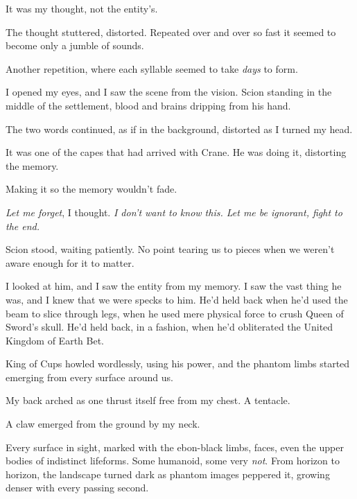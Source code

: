 It was my thought, not the entity's.



The thought stuttered, distorted.  Repeated over and over so fast it seemed to become only a jumble of sounds.



Another repetition, where each syllable seemed to take \emph{days} to form.



I opened my eyes, and I saw the scene from the vision.  Scion standing in the middle of the settlement, blood and brains dripping from his hand.



The two words continued, as if in the background, distorted as I turned my head.



It was one of the capes that had arrived with Crane.  He was doing it, distorting the memory.



Making it so the memory wouldn't fade.



\emph{Let me forget}, I thought.  \emph{I don't want to know this.  Let me be ignorant, fight to the end.}



Scion stood, waiting patiently.  No point tearing us to pieces when we weren't aware enough for it to matter.



I looked at him, and I saw the entity from my memory.  I saw the vast thing he was, and I knew that we were specks to him.  He'd held back when he'd used the beam to slice through legs, when he used mere physical force to crush Queen of Sword's skull.  He'd held back, in a fashion, when he'd obliterated the United Kingdom of Earth Bet.



King of Cups howled wordlessly, using his power, and the phantom limbs started emerging from every surface around us.



My back arched as one thrust itself free from my chest.  A tentacle.



A claw emerged from the ground by my neck.



Every surface in sight, marked with the ebon-black limbs, faces, even the upper bodies of indistinct lifeforms.  Some humanoid, some very \emph{not}.  From horizon to horizon, the landscape turned dark as phantom images peppered it, growing denser with every passing second.



